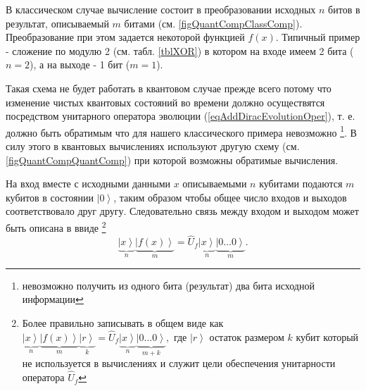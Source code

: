 

В классическом случае вычисление состоит в преобразовании исходных $n$
битов в результат, описываемый $m$ битами
(см. \autoref{figQuantCompClassComp}). Преобразование при этом
задается некоторой функцией $f\left(x\right)$. Типичный пример -
сложение по модулю 2 (см. табл. \ref {tblXOR}) в котором на входе имеем 2 бита
($n = 2$), а на выходе - 1 бит ($m = 1$).



Такая схема не будет работать в квантовом случае прежде всего потому
что изменение чистых квантовых состояний во времени должно
осуществятся посредством унитарного оператора эволюции
(\ref{eqAddDiracEvolutionOper}), т. е. должно быть обратимым что для
нашего классического примера невозможно \footnote{невозможно получить
  из одного бита (результат) два бита исходной информации}. В силу
этого в квантовых вычислениях  используют другую схему
(см. \autoref{figQuantCompQuantComp}) при которой возможны обратимые
вычисления.  

На вход вместе с исходными данными $x$ описываемыми $n$ кубитами
подаются $m$ кубитов в состоянии $\left|0\right>$, таким
образом чтобы общее число входов и выходов соответствовало друг
другу. Следовательно связь между входом и выходом может быть описана в
ввиде
\footnote{Более правильно записывать в общем виде как 
$
\underbrace{\left|x\right>}_n
\underbrace{\left|f\left(x\right)\right>}_m
\underbrace{\left|r\right>}_k = 
\hat{U}_f \underbrace{\left|x\right>}_n
\underbrace{\left|0 \dots 0\right>}_{m+k},
$
где $\left|r\right>$ остаток размером $k$ кубит который не
используется в вычислениях и служит цели обеспечения унитарности
оператора $\hat{U}_f$
}
\begin{equation}
\underbrace{\left|x\right>}_n
\underbrace{\left|f\left(x\right)\right>}_m = 
\hat{U}_f \underbrace{\left|x\right>}_n\underbrace{\left|0 \dots
  0\right>}_m.
\label{eqQuantCompQuantComp}
\end{equation}

